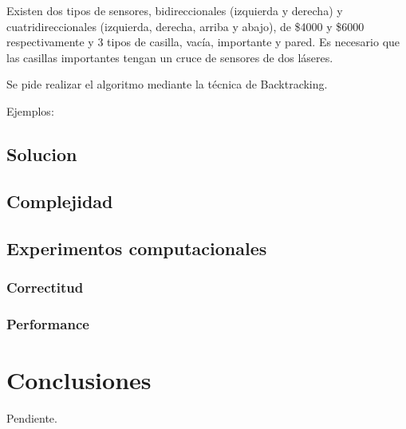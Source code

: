 \documentclass[a4paper,10pt,twoside]{article}
\begin{document}
Existen dos tipos de sensores, bidireccionales (izquierda y derecha) y cuatridireccionales (izquierda, derecha, arriba y abajo), de \$4000 y \$6000 respectivamente y 3 tipos de casilla, vacía, importante y pared. Es necesario que las casillas importantes tengan un cruce de sensores de dos láseres.

Se pide realizar el algoritmo mediante la técnica de Backtracking.

Ejemplos:

\subsection{Solucion}
\subsection{Complejidad}
\subsection{Experimentos computacionales}
\subsubsection{Correctitud}
\subsubsection{Performance}



\section{Conclusiones}

Pendiente.



\newpage
\end{document}
